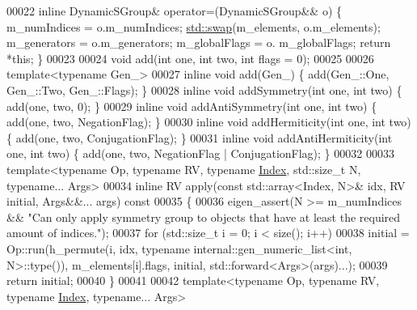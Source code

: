 \begin{DoxyCode}
00022     \textcolor{keyword}{inline} DynamicSGroup& operator=(DynamicSGroup&& o) \{ m\_numIndices = o.m\_numIndices; 
      \hyperlink{endian_8c_a3ca5ecd34b04d6a243c054ac3a57f68d}{std::swap}(m\_elements, o.m\_elements); m\_generators = o.m\_generators; m\_globalFlags = o.
      m\_globalFlags; \textcolor{keywordflow}{return} *\textcolor{keyword}{this}; \}
00023 
00024     \textcolor{keywordtype}{void} add(\textcolor{keywordtype}{int} one, \textcolor{keywordtype}{int} two, \textcolor{keywordtype}{int} flags = 0);
00025 
00026     \textcolor{keyword}{template}<\textcolor{keyword}{typename} Gen\_>
00027     \textcolor{keyword}{inline} \textcolor{keywordtype}{void} add(Gen\_) \{ add(Gen\_::One, Gen\_::Two, Gen\_::Flags); \}
00028     \textcolor{keyword}{inline} \textcolor{keywordtype}{void} addSymmetry(\textcolor{keywordtype}{int} one, \textcolor{keywordtype}{int} two) \{ add(one, two, 0); \}
00029     \textcolor{keyword}{inline} \textcolor{keywordtype}{void} addAntiSymmetry(\textcolor{keywordtype}{int} one, \textcolor{keywordtype}{int} two) \{ add(one, two, NegationFlag); \}
00030     \textcolor{keyword}{inline} \textcolor{keywordtype}{void} addHermiticity(\textcolor{keywordtype}{int} one, \textcolor{keywordtype}{int} two) \{ add(one, two, ConjugationFlag); \}
00031     \textcolor{keyword}{inline} \textcolor{keywordtype}{void} addAntiHermiticity(\textcolor{keywordtype}{int} one, \textcolor{keywordtype}{int} two) \{ add(one, two, NegationFlag | ConjugationFlag); \}
00032 
00033     \textcolor{keyword}{template}<\textcolor{keyword}{typename} Op, \textcolor{keyword}{typename} RV, \textcolor{keyword}{typename} \hyperlink{namespace_eigen_a62e77e0933482dafde8fe197d9a2cfde}{Index}, std::size\_t N, \textcolor{keyword}{typename}... Args>
00034     \textcolor{keyword}{inline} RV apply(\textcolor{keyword}{const} std::array<Index, N>& idx, RV initial, Args&&... args)\textcolor{keyword}{ const}
00035 \textcolor{keyword}{    }\{
00036       eigen\_assert(N >= m\_numIndices && \textcolor{stringliteral}{"Can only apply symmetry group to objects that have at least the
       required amount of indices."});
00037       \textcolor{keywordflow}{for} (std::size\_t i = 0; i < size(); i++)
00038         initial = Op::run(h\_permute(i, idx, \textcolor{keyword}{typename} internal::gen\_numeric\_list<int, N>::type()), 
      m\_elements[i].flags, initial, std::forward<Args>(args)...);
00039       \textcolor{keywordflow}{return} initial;
00040     \}
00041 
00042     \textcolor{keyword}{template}<\textcolor{keyword}{typename} Op, \textcolor{keyword}{typename} RV, \textcolor{keyword}{typename} \hyperlink{namespace_eigen_a62e77e0933482dafde8fe197d9a2cfde}{Index}, \textcolor{keyword}{typename}... Args>

\end{DoxyCode}
